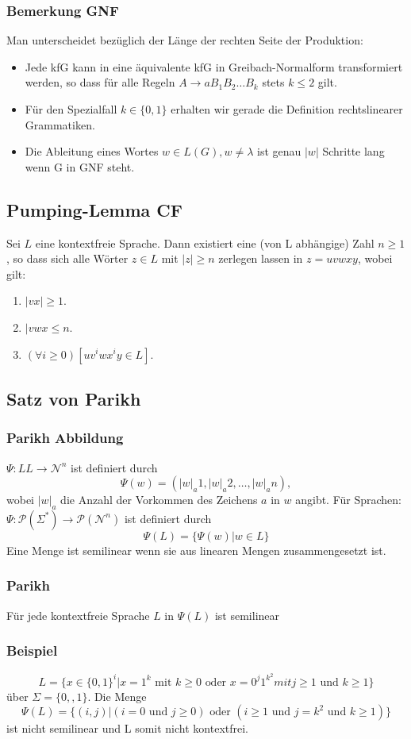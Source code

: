 \documentclass[9pt]{article}
\begin{document}
\subsubsection{Bemerkung GNF}
Man unterscheidet bezüglich der Länge der rechten Seite der Produktion:
\begin{itemize}
	\item Jede kfG kann in eine äquivalente kfG in Greibach-Normalform transformiert werden, so dass für alle Regeln $A \to aB_1B_2 \dots B_k$ stets $k \leq 2$ gilt.
	\item Für den Spezialfall $k \in \{0, 1\}$ erhalten wir gerade die Definition rechtslinearer Grammatiken.
	\item Die Ableitung eines Wortes $w \in L(G), w \neq \lambda$ ist genau $|w|$ Schritte lang wenn G in GNF steht.
\end{itemize}
\subsection{Pumping-Lemma CF}
Sei $L$ eine kontextfreie Sprache. Dann existiert eine (von L abhängige) Zahl $n \ge 1$, so dass sich alle Wörter $z \in L$ mit $|z| \ge n$ zerlegen lassen in $z = uvwxy$, wobei gilt:
\begin{enumerate}
	\item $|vx| \ge 1$.
	\item $|vwx \le n$.
	\item $(\forall i \ge 0)[uv^iwx^iy \in L]$.
\end{enumerate}
\subsection{Satz von Parikh}
\subsubsection{Parikh Abbildung}
$\Psi: LL \to \mathcal{N}^n$ ist definiert durch
$$\Psi(w) = (|w|_a1, |w|_a2, \dots, |w|_an),$$
wobei $|w|_a$ die Anzahl der Vorkommen des Zeichens $a$ in $w$ angibt. Für Sprachen:
$\Psi: \mathcal{P}(\Sigma^*) \to \mathcal{P}(\mathcal{N}^n)$ ist definiert durch
$$\Psi(L) = \{\Psi(w)|w \in L\}$$
Eine Menge ist semilinear wenn sie aus linearen Mengen zusammengesetzt ist.
\subsubsection{Parikh}
Für jede kontextfreie Sprache $L$ in $\Psi(L)$ ist semilinear
\subsubsection{Beispiel}
$$L = \{x \in \{0, 1\}^i | x = 1^k \text{ mit } k \ge 0 \text{ oder }  x = 0^j1^{k^2} mit j \ge 1 \text{ und } k \ge 1\}$$
über $\Sigma = \{0, ,1\}$. Die Menge
$$ \Psi(L) = \{(i, j)|(i = 0\text{ und }j \ge 0) \text{ oder } (i \ge 1 \text{ und } j = k^2 \text{ und } k \ge 1)\}$$
ist nicht semilinear und L somit nicht kontextfrei.
\end{document}

